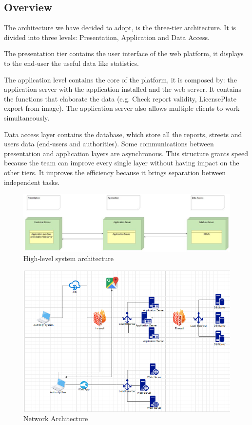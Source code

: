 \subsection{Overview}
The architecture we have decided to adopt, is the three-tier architecture.
It is divided into three levels: Presentation, Application and Data Access.

The presentation tier contains the user interface of the web platform, it displays to the end-user the useful data like statistics.

The application level contains the core of the platform, it is composed by: the application server with the application installed and the web server.
It contains the functions that elaborate the data (e.g. Check report validity, LicensePlate export from image).
The application server also allows multiple clients to work simultaneously.

Data access layer contains the database, which store all the reports, streets and users data (end-users and authorities).
Some communications between presentation and application layers are asynchronous.
This structure grants speed because the team can improve every single layer without having impact on the other tiers.
It improves the efficiency because it brings separation between independent tasks.

\begin{figure}
	
	\includegraphics[width=0.95\linewidth, height=0.20\textheight]{../DD/Images/architecture}
	\caption{High­‐level
		system
		architecture}
	\label{High­‐level
		system
		architecture}
\end{figure}
\newpage
\begin{figure}[H]
	\centering
	\includegraphics[width=0.98\linewidth, height=0.55\textheight]{Images/networkarchitecture}
	\caption{Network Architecture}
	\label{fig:networkarchitecture}
\end{figure}

